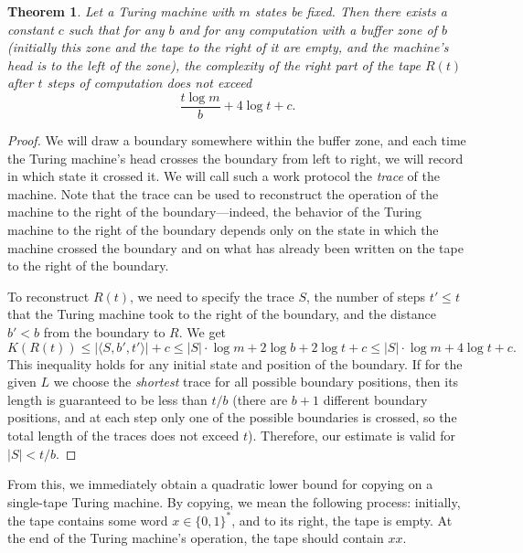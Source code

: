\documentclass[12pt,sans]{article}
\newcommand{\bits}{\{0,1\}}
\newcommand{\bitstr}{\bits^*}
\theoremstyle{definition}
\theoremstyle{plain}
\newtheorem{theorem}{Theorem}[section]
\theoremstyle{remark}
\begin{document}
\begin{theorem}
    Let a Turing machine with $m$ states be fixed. Then there exists a constant $c$ such that for any $b$ and for any computation with a buffer zone of $b$ (initially this zone and the tape to the right of it are empty, and the machine's head is to the left of the zone), the complexity of the right part of the tape $R(t)$ after $t$ steps of computation does not exceed
    $$\frac{t\log m}{b} + 4\log t + c.$$
\end{theorem}
\begin{proof}
    We will draw a boundary somewhere within the buffer zone, and each time the Turing machine's head crosses the boundary from left to right, we will record in which state it crossed it. We will call such a work protocol the \emph{trace} of the machine. Note that the trace can be used to reconstruct the operation of the machine to the right of the boundary—indeed, the behavior of the Turing machine to the right of the boundary depends only on the state in which the machine crossed the boundary and on what has already been written on the tape to the right of the boundary.

    To reconstruct $R(t)$, we need to specify the trace $S$, the number of steps $t' \le t$ that the Turing machine took to the right of the boundary, and the distance $b' < b$ from the boundary to $R$. We get
    $$
    K(R(t)) \le |\langle S, b', t'\rangle| + c
    \le |S|\cdot\log m + 2\log b + 2\log t + c
    \le |S|\cdot\log m + 4\log t + c.
    $$
    This inequality holds for any initial state and position of the boundary. If for the given $L$ we choose the \emph{shortest} trace for all possible boundary positions, then its length is guaranteed to be less than $t/b$ (there are $b + 1$ different boundary positions, and at each step only one of the possible boundaries is crossed, so the total length of the traces does not exceed $t$). Therefore, our estimate is valid for $|S| < t/b$.
\end{proof}

From this, we immediately obtain a quadratic lower bound for copying on a single-tape Turing machine. By copying, we mean the following process: initially, the tape contains some word $x \in \bitstr$, and to its right, the tape is empty. At the end of the Turing machine's operation, the tape should contain $xx$.
\end{document}

